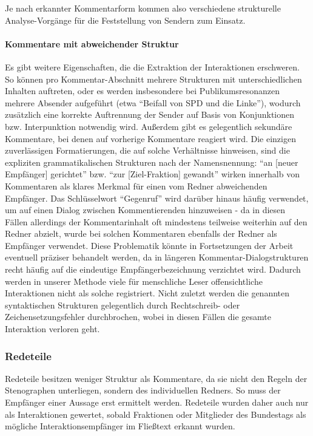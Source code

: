 Je nach erkannter Kommentarform kommen also verschiedene strukturelle
Analyse-Vorgänge für die Feststellung von Sendern zum Einsatz.

\paragraph{Kommentare mit abweichender Struktur}

Es gibt weitere Eigenschaften, die die Extraktion der Interaktionen
erschweren. So können pro Kommentar-Abschnitt mehrere Strukturen mit
unterschiedlichen Inhalten auftreten, oder es werden insbesondere bei
Publikumsresonanzen mehrere Absender aufgeführt (etwa
\enquote{Beifall von SPD und die Linke}), wodurch zusätzlich eine korrekte
Auftrennung der Sender auf Basis von Konjunktionen bzw. Interpunktion
notwendig wird. Außerdem gibt es gelegentlich sekundäre Kommentare, bei denen
auf vorherige Kommentare reagiert wird. Die einzigen zuverlässigen
Formatierungen, die auf solche Verhältnisse hinweisen, sind die expliziten
grammatikalischen Strukturen nach der Namensnennung:
\enquote{an [neuer Empfänger] gerichtet} bzw. \enquote{zur [Ziel-Fraktion] gewandt}
wirken innerhalb von Kommentaren als klares Merkmal für einen vom Redner
abweichenden Empfänger. Das Schlüsselwort \enquote{Gegenruf} wird darüber
hinaus häufig verwendet, um auf einen Dialog zwischen Kommentierenden
hinzuweisen - da in diesen Fällen allerdings der Kommentarinhalt oft
mindestens teilweise weiterhin auf den Redner abzielt, wurde bei solchen
Kommentaren ebenfalls der Redner als Empfänger verwendet. Diese
Problematik könnte in Fortsetzungen der Arbeit eventuell präziser behandelt
werden, da in längeren Kommentar-Dialogstrukturen recht häufig auf die
eindeutige Empfängerbezeichnung verzichtet wird. Dadurch werden in unserer
Methode viele für menschliche Leser offensichtliche Interaktionen nicht als
solche registriert. Nicht zuletzt werden die genannten syntaktischen
Strukturen gelegentlich durch Rechtschreib- oder Zeichensetzungsfehler
durchbrochen, wobei in diesen Fällen die gesamte Interaktion verloren geht.

\subsubsection{Redeteile}
Redeteile besitzen weniger Struktur als Kommentare, da sie nicht den Regeln der
Stenographen unterliegen, sondern des individuellen Redners. So muss der
Empfänger einer Aussage erst ermittelt werden. Redeteile wurden daher auch nur
als Interaktionen gewertet, sobald Fraktionen oder Mitglieder des Bundestags
als mögliche Interaktionsempfänger im Fließtext erkannt wurden.

